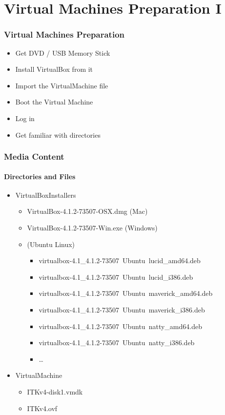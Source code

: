 \section{Virtual Machines Preparation I}


\begin{frame}
\frametitle{Virtual Machines Preparation}
\begin{itemize}
\item Get DVD / USB Memory Stick
\item Install VirtualBox from it
\item Import the VirtualMachine file
\item Boot the Virtual Machine
\item Log in
\item Get familiar with directories
\end{itemize}
\end{frame}


\begin{frame}
\frametitle{Media Content}
\framesubtitle{Directories and Files}
\begin{itemize}
\item VirtualBoxInstallers
\begin{itemize}
\item VirtualBox-4.1.2-73507-OSX.dmg (Mac)
\item VirtualBox-4.1.2-73507-Win.exe (Windows)
\item (Ubuntu Linux)
\begin{itemize}
\item virtualbox-4.1\_4.1.2-73507~Ubuntu~lucid\_amd64.deb
\item virtualbox-4.1\_4.1.2-73507~Ubuntu~lucid\_i386.deb
\item virtualbox-4.1\_4.1.2-73507~Ubuntu~maverick\_amd64.deb
\item virtualbox-4.1\_4.1.2-73507~Ubuntu~maverick\_i386.deb
\item virtualbox-4.1\_4.1.2-73507~Ubuntu~natty\_amd64.deb
\item virtualbox-4.1\_4.1.2-73507~Ubuntu~natty\_i386.deb
\item \ldots
\end{itemize}
\end{itemize}
\pause
\item VirtualMachine
\begin{itemize}
\item  ITKv4-disk1.vmdk
\item  ITKv4.ovf
\end{itemize}
\end{itemize}
\end{frame}

